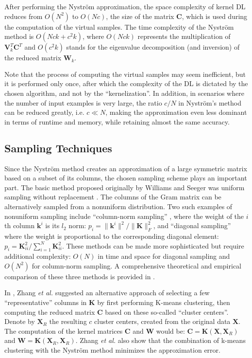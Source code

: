 \documentclass[journal]{IEEEtran}
\newcommand{\bk}{\mathbf{k}}
\newcommand{\bX}{\mathbf{X}}
\newcommand{\bK}{\mathbf{K}}
\newcommand{\bC}{\mathbf{C}}
\newcommand{\bW}{\mathbf{W}}
\begin{document}
After performing the Nystr\"{o}m approximation, the space complexity of kernel DL reduces from $O(N^2)$ to $O(Nc)$, the size of the matrix $\bC$, which is used during the computation of the virtual samples. The time complexity of the Nystr\"{o}m method is $O(Nck+c^2k)$, where $O(Nck)$ represents the multiplication of $\mathbf{V}_k^T \bC^T$ and $O(c^2k)$ stands for the eigenvalue decomposition (and inversion) of the reduced matrix $\bW_k$.

Note that the process of computing the virtual samples may seem inefficient, but it is performed only once, after which the complexity of the DL is dictated by the chosen algorithm, and not by the ``kernelization''. In addition, in scenarios where the number of input examples is very large, the ratio $c/N$ in Nystr\"{o}m's method can be reduced greatly, i.e. $c \ll N$, making the approximation even less dominant in terms of runtime and memory, while retaining almost the same accuracy.

\subsection{Sampling Techniques} \label{SS:SamplingNystrom}
Since the Nystr\"{o}m method creates an approximation of a large symmetric matrix based on a subset of its columns, the chosen sampling scheme plays an important part. The basic method proposed originally by Williams and Seeger was uniform sampling without replacement \cite{Nystrom}. The columns of the Gram matrix can be alternatively sampled from a nonuniform distribution. Two such examples of nonuniform sampling include ``column-norm sampling'' \cite{ColumnNormSampling}, where the weight of the $i$th column $\bk^i$ is its $l_2$ norm: $p_i=\|\bk^i\|^2 / \|\bK\|_F^2$, and ``diagonal sampling'' \cite{DiagonalSampling} where the weight is proportional to the corresponding diagonal element: $p_i=\bK_{ii}^2 / \sum_{i=1}^N{\bK_{ii}^2}$. These methods can be made more sophisticated but require additional complexity: $O(N)$ in time and space for diagonal sampling and $O(N^2)$ for column-norm sampling. A comprehensive theoretical and empirical comparison of these three methods is provided in \cite{NystromSample}.

In \cite{KmeansSampling}, Zhang \textit{et al.} suggested an alternative approach of selecting a few ``representative'' columns in $\bK$ by first performing K-means clustering, then computing the reduced matrix $\bC$ based on these so-called ``cluster centers''. Denote by $\bX_R$ the resulting $c$ cluster centers, created from the original data $\bX$. The computation of the kernel matrices $\bC$ and $\bW$ would be: $\bC=\bK(\bX,\bX_R)$ and $\bW=\bK(\bX_R,\bX_R)$. Zhang \textit{et al.} also show that the combination of k-means clustering with the Nystr\"{o}m method minimizes the approximation error.
\end{document}
